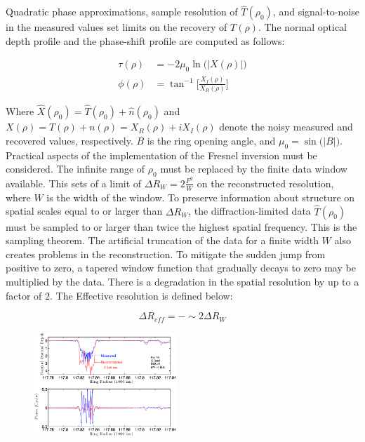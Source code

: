 \documentclass{article}
\theoremstyle{mystyle}
\begin{document}
\noindent Quadratic phase approximations, sample resolution of $\hat{T}(\rho_0)$, and signal-to-noise in the measured values set limits on the recovery of $T(\rho)$. The normal optical depth profile and the phase-shift profile are computed as follows:

\begin{align}
\tau(\rho) &= -2\mu_{0}\ln\big(|X(\rho)|\big) \\
\phi(\rho) &= \tan^{-1}\bigg[\frac{X_{I}(\rho)}{X_{R}(\rho)}\bigg]
\end{align}

\noindent Where $\hat{X}(\rho_0) = \hat{T}(\rho_0) + \hat{n}(\rho_0)$ and $X(\rho) = T(\rho)+n(\rho) = X_{R}(\rho)+iX_{I}(\rho)$ denote the noisy measured and recovered values, respectively. $B$ is the ring opening angle, and $\mu_0 = \sin\big(|B|\big)$. Practical aspects of the implementation of the Fresnel inversion must be considered. The infinite range of $\rho_0$ must be replaced by the finite data window available. This sets of a limit of $\Delta R_{W} = 2\frac{F^2}{W}$ on the reconstructed resolution, where $W$ is the width of the window. To preserve information about structure on spatial scales equal to or larger than $\Delta R_{W}$, the diffraction-limited data $\hat{T}(\rho_0)$ must be sampled to or larger than twice the highest spatial frequency. This is the sampling theorem. The artificial truncation of the data for a finite width $W$ also creates problems in the reconstruction. To mitigate the sudden jump from positive to zero, a tapered window function that gradually decays to zero may be multiplied by the data. There is a degradation in the spatial resolution by up to a factor of $2$. The Effective resolution is defined below:

\begin{equation}
\Delta R_{eff} = -\sim 2\Delta R_{W}
\end{equation}

\begin{figure}
	\begin{center}
	\includegraphics[width = 0.48\textwidth]{USER_10}
	\end{center}
\end{figure}
\end{document}
